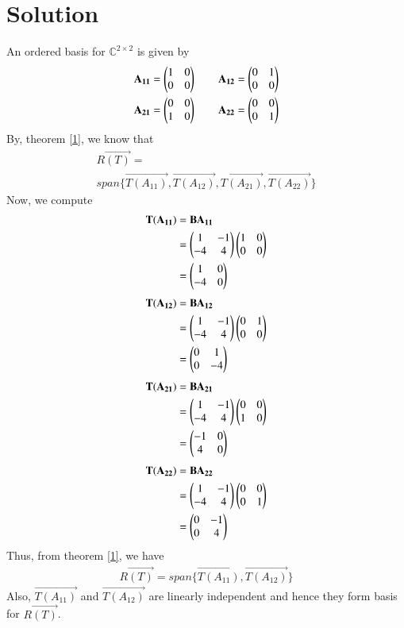 \documentclass[journal,12pt,twocolumn]{IEEEtran}
\begin{document}
\section{Solution}
An ordered basis for $\mathbb{C}^{2\times2}$ is given by
\begin{align}
& \mathbf{A_{11}} = \begin{pmatrix}1 & 0 \\ 0 & 0\end{pmatrix} \qquad \mathbf{A_{12}} = \begin{pmatrix}0 & 1 \\ 0 & 0\end{pmatrix} \\
& \mathbf{A_{21}} = \begin{pmatrix}0 & 0 \\ 1 & 0\end{pmatrix} \qquad \mathbf{A_{22}} = \begin{pmatrix}0 & 0 \\ 0 & 1\end{pmatrix}
\end{align}
By, theorem \eqref{1}, we know that
\begin{multline}
R\vec{(T)} = \\ span\{\vec{T(A_{11})}, \vec{T(A_{12})},\vec{T(A_{21})},\vec{T(A_{22})}\} \label{2}	
\end{multline}
Now, we compute
\begin{align}  
\mathbf{T(A_{11})} & = \mathbf{BA_{11}} \\
                & = \begin{pmatrix}1 & -1 \\ -4 & 4\end{pmatrix}\begin{pmatrix}1 & 0 \\ 0 & 0\end{pmatrix} \\
                & = \begin{pmatrix}1 & 0 \\ -4 & 0\end{pmatrix} \label{3}
\end{align}
\begin{align}  
	\mathbf{T(A_{12})} & = \mathbf{BA_{12}} \\
	& = \begin{pmatrix}1 & -1 \\ -4 & 4\end{pmatrix}\begin{pmatrix}0 & 1 \\ 0 & 0\end{pmatrix} \\
	& = \begin{pmatrix}0 & 1 \\ 0 & -4\end{pmatrix} \label{4}
\end{align}
\begin{align}  
	\mathbf{T(A_{21})} & = \mathbf{BA_{21}} \\
	& = \begin{pmatrix}1 & -1 \\ -4 & 4\end{pmatrix}\begin{pmatrix}0 & 0 \\ 1 & 0\end{pmatrix} \\
	& = \begin{pmatrix}-1 & 0 \\ 4 & 0\end{pmatrix} \label{5}
\end{align}
\begin{align}  
	\mathbf{T(A_{22})} & = \mathbf{BA_{22}} \\
	& = \begin{pmatrix}1 & -1 \\ -4 & 4\end{pmatrix}\begin{pmatrix}0 & 0 \\ 0 & 1\end{pmatrix} \\
	& = \begin{pmatrix}0 & -1 \\ 0 & 4\end{pmatrix} \label{6}
\end{align}
Thus, from theorem \eqref{1}, we have
\begin{align}
	R\vec{(T)} = span\{\vec{T(A_{11})}, \vec{T(A_{12})}\}
\end{align}
Also, $\vec{T(A_{11})}$ and $\vec{T(A_{12})}$ are linearly independent and hence they form basis for $R\vec{(T)}$.
\end{document}
